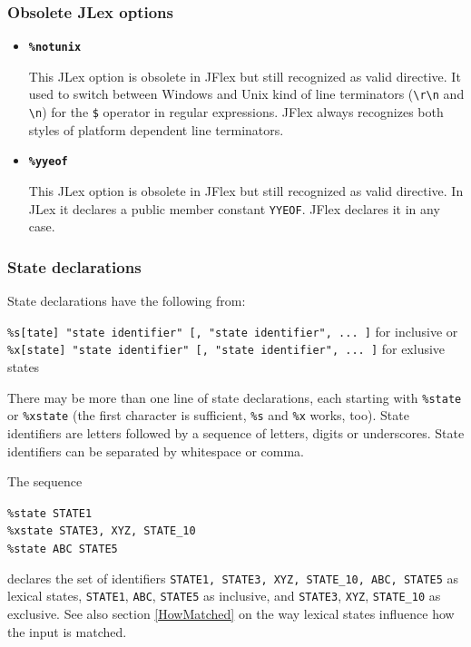 \documentclass[11pt]{scrartcl}
\begin{document}
\subsubsection{Obsolete JLex options\label{Obsolete}}
\begin{itemize}
\item
{\bf \texttt{\%notunix}}

This JLex option is obsolete in JFlex but still recognized as valid directive.
It used to switch between Windows and Unix kind of line terminators (\verb+\r\n+
and \verb+\n+) for the \texttt{\$} operator in regular expressions. JFlex
always recognizes both styles of platform dependent line terminators.
 
\item
{\bf \texttt{\%yyeof}}

This JLex option is obsolete in JFlex but still recognized as valid directive.
In JLex it declares a public member constant \texttt{YYEOF}. JFlex declares it in any case.
\end{itemize}

\subsubsection{State declarations\label{StateDecl}}
State declarations have the following from:

\texttt{\%s[tate] "state identifier" [, "state identifier", ... ]} for inclusive or\\
\texttt{\%x[state] "state identifier" [, "state identifier", ... ]} for exlusive states

There may be more than one line of state declarations, each starting with
\texttt{\%state} or \texttt{\%xstate} (the first character is sufficient,
\texttt{\%s} and \texttt{\%x} works, too). State identifiers are letters followed 
by a sequence of letters, digits or underscores. State identifiers can be separated 
by whitespace or comma.

The sequence

\texttt{\%state STATE1}\\
\texttt{\%xstate STATE3, XYZ, STATE\_10}\\
\texttt{\%state ABC STATE5}

declares the set of identifiers \texttt{{STATE1, STATE3, XYZ,
    STATE\_10, ABC, STATE5}} as lexical states, \texttt{STATE1}, \texttt{ABC}, \texttt{STATE5}
as inclusive, and \texttt{STATE3}, \texttt{XYZ}, \texttt{STATE\_10} as exclusive. 
See also section
\ref{HowMatched} on the way lexical states influence how the input is
matched.
 
\end{document}

